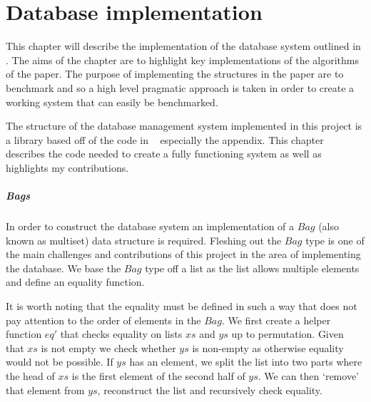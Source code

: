 \chapter{Database implementation}\label{chap:database}
This chapter will describe the implementation of the database system outlined in
\relalg{}. The aims of the chapter are to highlight key implementations of the
algorithms of the paper. The purpose of implementing the structures in the paper
are to benchmark and so a high level pragmatic approach is taken in order to
create a working system that can easily be benchmarked.

The structure of the database management system implemented in this
project is a library based off of the code in
\relalg{}~\cite{RelationalAlgebraByWayOfAdjunctions} especially the appendix.
This chapter describes the code needed to create a fully functioning
system as well as highlights my contributions.

\paragraph{Bags} In order to construct the database system an
implementation of a $Bag$ (also known as multiset) data structure is
required. Fleshing out the $Bag$ type is one of the main challenges and
contributions of this project in the area of implementing the database. We
base the $Bag$ type off a list as the list allows multiple elements and
define an equality function.



\noindent
It is worth noting that the equality must be defined in such a way that does not
pay attention to the order of elements in the $Bag$. We first create a helper
function $eq'$ that checks equality on lists $xs$ and $ys$ up to permutation.
Given that $xs$ is not empty we check whether $ys$ is non-empty as otherwise
equality would not be possible. If $ys$ has an element, we split the list into
two parts where the head of $xs$ is the first element of the second half of
$ys$. We can then `remove' that element from $ys$, reconstruct the list and
recursively check equality.

